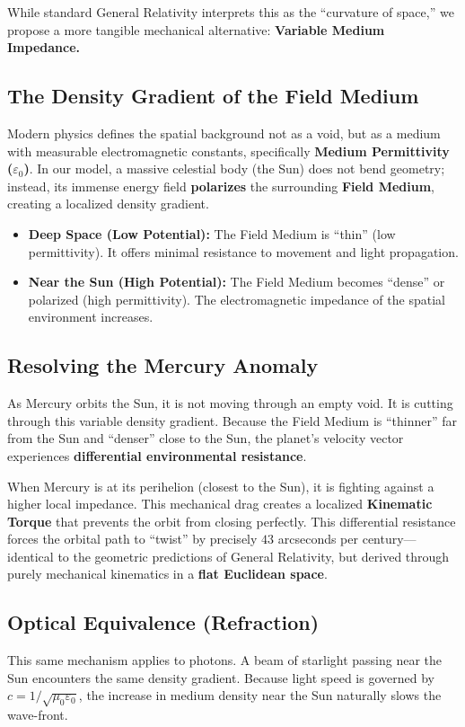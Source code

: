 \documentclass[reprint,amsmath,amssymb,aps,prd,twocolumn]{revtex4-2}
\begin{document}
While standard General Relativity interprets this as the ``curvature of space,'' we propose a more tangible mechanical alternative: \textbf{Variable Medium Impedance.}

\subsection{The Density Gradient of the Field Medium}
Modern physics defines the spatial background not as a void, but as a medium with measurable electromagnetic constants, specifically \textbf{Medium Permittivity ($\varepsilon_0$)}. In our model, a massive celestial body (the Sun) does not bend geometry; instead, its immense energy field \textbf{polarizes} the surrounding \textbf{Field Medium}, creating a localized density gradient.

\begin{itemize}
    \item \textbf{Deep Space (Low Potential):} The Field Medium is ``thin'' (low permittivity). It offers minimal resistance to movement and light propagation.
    \item \textbf{Near the Sun (High Potential):} The Field Medium becomes ``dense'' or polarized (high permittivity). The electromagnetic impedance of the spatial environment increases.
\end{itemize}

\subsection{Resolving the Mercury Anomaly}
As Mercury orbits the Sun, it is not moving through an empty void. It is cutting through this variable density gradient. Because the Field Medium is ``thinner'' far from the Sun and ``denser'' close to the Sun, the planet's velocity vector experiences \textbf{differential environmental resistance}. 

When Mercury is at its perihelion (closest to the Sun), it is fighting against a higher local impedance. This mechanical drag creates a localized \textbf{Kinematic Torque} that prevents the orbit from closing perfectly. This differential resistance forces the orbital path to ``twist'' by precisely $43$ arcseconds per century---identical to the geometric predictions of General Relativity, but derived through purely mechanical kinematics in a \textbf{flat Euclidean space}.

\subsection{Optical Equivalence (Refraction)}
This same mechanism applies to photons. A beam of starlight passing near the Sun encounters the same density gradient. Because light speed is governed by $c = 1/\sqrt{\mu_0 \varepsilon_0}$, the increase in medium density near the Sun naturally slows the wave-front. 
\end{document}

